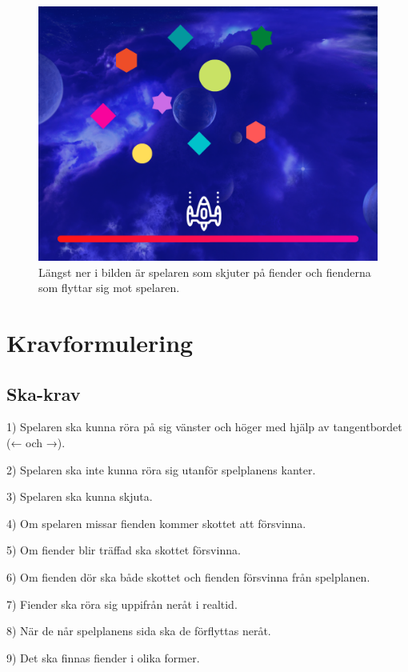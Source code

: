 \documentclass{TDP005mall}
\begin{document}
\begin{figure}[h!]
    \centering
    \includegraphics [scale=0.4] {Kravspecifikation/images/game.png}
    \caption{Längst ner i bilden är spelaren som skjuter på fiender och fienderna som flyttar sig mot spelaren.}
\end{figure}

\newpage

\section{Kravformulering}

\subsection{Ska-krav}
1) Spelaren ska kunna röra på sig vänster och höger med hjälp av tangentbordet (← och →).

2) Spelaren ska inte kunna röra sig utanför spelplanens kanter.

3) Spelaren ska kunna skjuta.

4) Om spelaren missar fienden kommer skottet att försvinna.

5) Om fiender blir träffad ska skottet försvinna.

6) Om fienden dör ska både skottet och fienden försvinna från spelplanen.

7) Fiender ska röra sig uppifrån neråt i realtid.

8) När de når spelplanens sida ska de förflyttas neråt.

9) Det ska finnas fiender i olika former.
\end{document}

